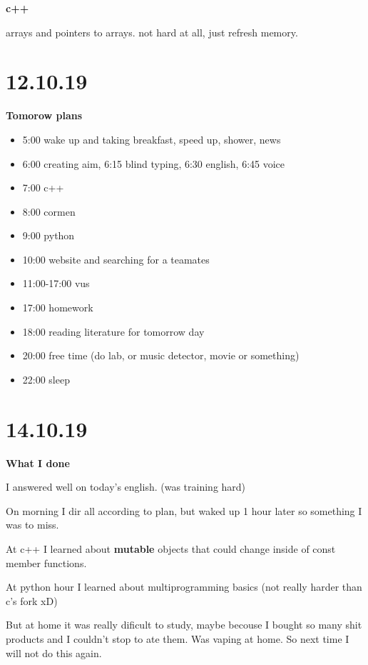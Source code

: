 \documentclass[12pt,a4paper,titlepage]{article}
\begin{document}
\begin{center}
  \large \textbf{c++}
\end{center}

arrays and pointers to arrays. not hard at all, just refresh memory.

\newpage
\section{12.10.19}

\begin{center}
  \large \textbf{Tomorow plans}
\end{center}

\begin{itemize}
  \item 5:00 wake up and taking breakfast, speed up, shower, news
  \item 6:00 creating aim, 6:15 blind typing, 6:30 english, 6:45 voice
  \item 7:00 c++
  \item 8:00 cormen
  \item 9:00 python
  \item 10:00 website and searching for a teamates
  \item 11:00-17:00 vus
  \item 17:00 homework
  \item 18:00 reading literature for tomorrow day
  \item 20:00 free time (do lab, or music detector, movie or something)
  \item 22:00 sleep
\end{itemize}

\newpage
\section{14.10.19}

\begin{center}
  \large \textbf{What I done}
\end{center}

I answered well on today's english. (was training hard) \par
On morning I dir all according to plan, but waked up 1 hour later so
something I was to miss. \par
At c++ I learned about \textbf{mutable} objects that could change inside
of const member functions. \par
At python hour I learned about multiprogramming basics (not really
harder than c's fork xD) \par
But at home it was really dificult to study, maybe becouse I bought so
many shit products and I couldn't stop to ate them. Was vaping at home.
So next time I will not do this again.
\end{document}
